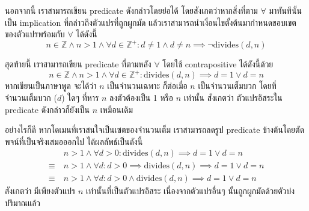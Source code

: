 \begin{example}
นอกจากนี้ เราสามารถเขียน predicate ดังกล่าวโดยย่อได้ โดยสังเกตว่าหากสิ่งที่ตาม $\forall$ มาทันทีนั้นเป็น implication ที่กล่าวถึงตัวแปรที่ถูกผูกมัด แล้วเราสามารถนำเงื่อนไขตั้งต้นมากำหนดขอบเขตของตัวแปรพร้อมกับ $\forall$ ได้ดังนี้ \[n\in\mathbb{Z}\wedge n>1\wedge\forall d\in\mathbb{Z}^+: d\neq 1\wedge d\neq n \implies \neg\mathrm{divides}(d,n)\]

สุดท้ายนี้ เราสามารถเขียน predicate ที่ตามหลัง $\forall$ โดยใช้ contrapositive ได้ดังนี้ด้วย
\[n\in\mathbb{Z}\wedge n>1\wedge \forall d\in\mathbb{Z}^+: \mathrm{divides}(d,n)\implies d=1\vee d=n\]
หากเขียนเป็นภาษาพูด จะได้ว่า $n$ เป็นจำนวนเฉพาะ ก็ต่อเมื่อ $n$ เป็นจำนวนเต็มบวก โดยที่จำนวนเต็มบวก ($d$) ใดๆ ที่หาร $n$ ลงตัวต้องเป็น 1 หรือ $n$ เท่านั้น \enskip สังเกตว่า ตัวแปรอิสระใน predicate ดังกล่าวก็ยังเป็น $n$ เหมือนเดิม

อย่างไรก็ดี หากโดเมนที่เราสนใจเป็นเซตของจำนวนเต็ม เราสามารถลดรูป predicate ข้างต้นโดยตัดพจน์ที่เป็นจริงเสมอออกไป ได้ผลลัพธ์เป็นดังนี้
\begin{align*}
& n>1\wedge \forall d>0: \mathrm{divides}(d,n)\implies d=1\vee d=n \\
\equiv\ & n>1\wedge \forall d: d>0 \implies \mathrm{divides}(d,n)\implies d=1\vee d=n \\
\equiv\ & n>1\wedge \forall d:  d>0 \wedge \mathrm{divides}(d,n) \implies d=1\vee d=n
\end{align*}
สังเกตว่า มีเพียงตัวแปร $n$ เท่านั้นที่เป็นตัวแปรอิสระ เนื่องจากตัวแปรอื่นๆ นั้นถูกผูกมัดด้วยตัวบ่งปริมาณแล้ว
\end{example}

